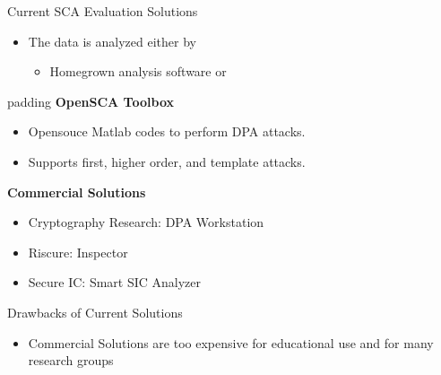 \documentclass[xcolor=pdftex,dvipsnames,table,final]{beamer}
\begin{document}
\begin{frame}[fragile]{}
\begin{columns}[t]
\begin{column}{.31\linewidth}
\begin{block}{Current SCA Evaluation Solutions}
        \begin{itemize}
            \item The data is analyzed either by
            \begin{itemize}
                \item Homegrown analysis software or
            \end{itemize}
        \end{itemize}
        \begin{center}
        \begin{minipage}[t]{0.9\linewidth}  
        \begin{beamercolorbox}[rounded=true]{padding}
          \textbf{OpenSCA Toolbox}
          {\small
          \begin{itemize}
            \item Opensouce Matlab codes to perform DPA attacks.
            \item Supports first, higher order, and template attacks.
          \end{itemize}
        }
        \end{beamercolorbox}
        \end{minipage}
        \end{center}
        {\large\textbf{Commercial Solutions}}%
        \begin{itemize}
          \item Cryptography Research: DPA Workstation\texttrademark
          \item Riscure: Inspector
          \item Secure IC: Smart SIC Analyzer 
        \end{itemize}
      \end{block}
          \begin{block}{Drawbacks of Current Solutions}   
            \begin{itemize}
              \item Commercial Solutions are too expensive for educational use and for
                    many research groups


\end{itemize}
\end{block}
\end{column}
\end{columns}
\end{frame}
\end{document}
